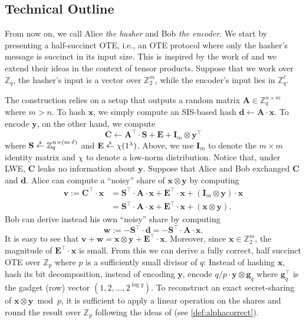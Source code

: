 \documentclass{article}
\newcommand{\getsr}{\overset{\raisebox{-1pt}{$\scriptscriptstyle \$$}}{\gets}}
\newcommand{\sample}{\getsr}
\newcommand{\Z}{\mathbb{Z}}
\renewcommand{\sec}{\ensuremath{\lambda}}
\newcommand{\id}{\ensuremath{\mathbf{I}}}
\newcommand\bbbone{1}
\begin{document}
\subsection{Technical Outline}
From now on, we call Alice \emph{the hasher} and Bob \emph{the encoder}.
We start by presenting a half-succinct OTE, i.e., an OTE protocol where only the hasher's message is succinct in its input size. This is inspired by the work of \cite{EC:AbrRoySch24} 
and we extend their ideas in the context of tensor products. Suppose that we work over $\Z_q$, the hasher's input is a vector over $\Z_2^m$, while the encoder's input lies in $\Z_q^\ell$.

The construction relies on a setup that outputs a random matrix $\mathbf{A}\in\Z_q^{n\times m}$ where $m>n$. To hash $\mathbf{x}$, we simply compute an SIS-based hash $\mathbf{d}\gets \mathbf{A}\cdot \mathbf{x}$. To encode $\mathbf{y}$, on the other hand, we compute
\[\mathbf{C}\gets \mathbf{A}^\intercal \cdot \mathbf{S}+\mathbf{E}+\id_m\otimes \mathbf{y}^\intercal\]
where $\mathbf{S}\sample\Z_q^{n\times (m\cdot \ell)}$ and $\mathbf{E}\sample\chi(\bbbone^\sec)$. Above, we use $\id_m$ to denote the $m\times m$ identity matrix and $\chi$ to denote a low-norm distribution. Notice that, under LWE, $\mathbf{C}$ leaks no information about $\mathbf{y}$. Suppose that Alice and Bob exchanged $\mathbf{C}$ and $\mathbf{d}$. Alice can compute a ``noisy'' share of $\mathbf{x}\otimes \mathbf{y}$ by computing
\begin{align*}
\mathbf{v}:=\mathbf{C}^\intercal\cdot \mathbf{x}&=\mathbf{S}^\intercal\cdot \mathbf{A} \cdot \mathbf{x}+\mathbf{E}^\intercal\cdot\mathbf{x}+(\id_m\otimes \mathbf{y})\cdot\mathbf{x}\\
&=\mathbf{S}^\intercal\cdot\mathbf{A} \cdot \mathbf{x}+\mathbf{E}^\intercal\cdot\mathbf{x}+(\mathbf{x}\otimes \mathbf{y}).
\end{align*}
Bob can derive instead his own ``noisy'' share by computing
\[\mathbf{w}:=-\mathbf{S}^\intercal \cdot \mathbf{d}=-\mathbf{S}^\intercal\cdot\mathbf{A}\cdot \mathbf{x}.\]
It is easy to see that $\mathbf{v}+\mathbf{w}=\mathbf{x}\otimes \mathbf{y}+\mathbf{E}^\intercal\cdot\mathbf{x}$. Moreover, since $\mathbf{x}\in\Z_2^m$, the magnitude of $\mathbf{E}^\intercal\cdot\mathbf{x}$ is small. From this we can derive a fully correct, half succinct OTE over $\Z_p$ where $p$ is a sufficiently small divisor of $q$: Instead of hashing $\mathbf{x}$, hash its bit decomposition, instead of encoding $\mathbf{y}$, encode $q/p\cdot \mathbf{y}\otimes \mathbf{g}_q$ where $\mathbf{g}_q^\intercal$ is the gadget (row) vector $(1, 2, \dots, 2^{\log q})$. To reconstruct an exact secret-sharing of $\mathbf{x}\otimes \mathbf{y} \bmod p$, it is sufficient to apply a linear operation on the shares and round the result over $\Z_p$ following the ideas of \cite{C:DHRW16} (see \ref{def:alphacorrect}).
\end{document}
